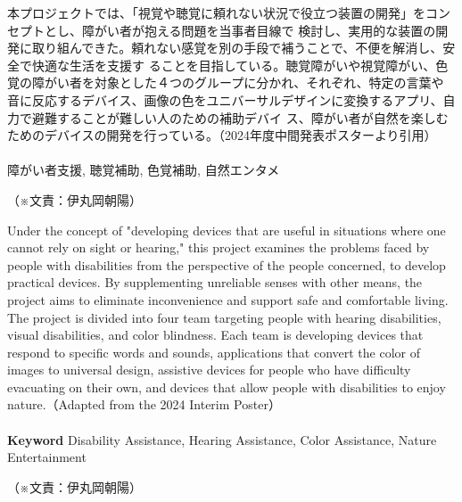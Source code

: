 \documentclass[11pt,a4paper]{report}
\newcommand{\Writer}[1]{
  \normalsize
  \begin{flushright}
    （※文責：#1）
  \end{flushright}
}
\begin{document}
{
    \centerline{
      \huge{}
    }
    \vspace{1cm}
    \noindent\space
    本プロジェクトでは、「視覚や聴覚に頼れない状況で役立つ装置の開発」をコンセプトとし、障がい者が抱える問題を当事者目線で
検討し、実用的な装置の開発に取り組んできた。頼れない感覚を別の手段で補うことで、不便を解消し、安全で快適な生活を支援す
ることを目指している。聴覚障がいや視覚障がい、色覚の障がい者を対象とした４つのグループに分かれ、それぞれ、特定の言葉や
音に反応するデバイス、画像の色をユニバーサルデザインに変換するアプリ、自力で避難することが難しい人のための補助デバイ
ス、障がい者が自然を楽しむためのデバイスの開発を行っている。（2024年度中間発表ポスターより引用\cite{概要}）\\
\\
\noindent{} \indent 障がい者支援, 聴覚補助, 色覚補助, 自然エンタメ
\Writer{伊丸岡朝陽}

}
\newpage
{
    \centerline{
      \textbf{\huge{}}
    }
    \vspace{1cm}
    \noindent\space
    Under the concept of "developing devices that are useful in situations where one cannot rely on sight or hearing," this project examines the
problems faced by people with disabilities from the perspective of the people concerned, to develop practical devices. By supplementing
unreliable senses with other means, the project aims to eliminate inconvenience and support safe and comfortable living. The project is
divided into four team targeting people with hearing disabilities, visual disabilities, and color blindness. Each team is developing devices that
respond to specific words and sounds, applications that convert the color of images to universal design, assistive devices for people who
have difficulty evacuating on their own, and devices that allow people with disabilities to enjoy nature.（Adapted from the 2024 Interim Poster\cite{概要}）\\
\\
\noindent\textbf{\textsf{Keyword}} \indent Disability Assistance, Hearing Assistance, Color Assistance, Nature Entertainment
\Writer{伊丸岡朝陽}

}
\newpage

\tableofcontents %
\newpage

\pagestyle{fancy}
\fancyhead{} %
\end{document}

